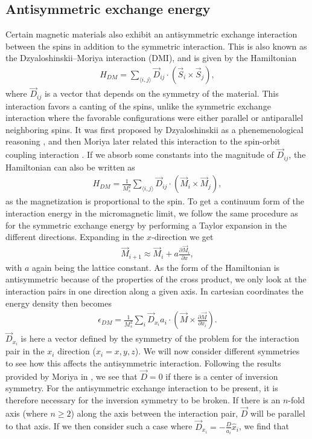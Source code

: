 \documentclass[12pt, a4paper]{article}		%
\numberwithin{equation}{section}
\begin{document}
\subsection{Antisymmetric exchange energy}
Certain magnetic materials also exhibit an antisymmetric exchange interaction between the spins in addition to the symmetric interaction. This is also known as the Dzyaloshinskii--Moriya interaction (DMI), and is given by the Hamiltonian
\begin{align}
\label{eq:DMI_Hamiltonian_S}
H_{DM} = \sum_{\langle i,j \rangle} \vec{D}_{ij} \cdot (\vec{S}_i\times\vec{S}_j),
\end{align}
where $\vec{D}_{ij}$ is a vector that depends on the symmetry of the material. This interaction favors a canting of the spins, unlike the symmetric exchange interaction where the favorable configurations were either parallel or antiparallel neighboring spins. It was first proposed by Dzyaloshinskii as a phenemenological reasoning \cite{Dzyaloshinskii1958}, and then Moriya later related this interaction to the spin-orbit coupling interaction \cite{Moriya1960}. If we absorb some constants into the magnitude of $\vec{D}_{ij}$, the Hamiltonian can also be written as
\begin{align}
\label{eq:DMI_Hamiltonian_M}
H_{DM} = \frac{1}{M_s^2}\sum_{\langle i,j \rangle} \vec{D}_{ij} \cdot (\vec{M}_i\times\vec{M}_j),
\end{align}
as the magnetization is proportional to the spin. To get a continuum form of the interaction energy in the micromagnetic limit, we follow the same procedure as for the symmetric exchange energy by performing a Taylor expansion in the different directions. Expanding in the $x$-direction we get
\begin{align}
\vec{M}_{i+1} \approx \vec{M}_i + a\frac{\partial \vec{M}_i}{\partial x},
\end{align}
with $a$ again being the lattice constant. As the form of the Hamiltonian is antisymmetric because of the properties of the cross product, we only look at the interaction pairs in one direction along a given axis. In cartesian coordinates the energy density then becomes
\begin{align}
\epsilon_{DM} = \frac{1}{M_s^2}\sum_i\vec{D}_{x_i}a_i\cdot(\vec{M}\times\frac{\partial \vec{M}}{\partial x_i}).
\end{align}
$\vec{D}_{x_i}$ is here a vector defined by the symmetry of the problem for the interaction pair in the $x_i$ direction ($x_i = x, y, z$). We will now consider different symmetries to see how this affects the antisymmetric interaction. Following the results provided by Moriya in \cite{Moriya1960}, we see that $\vec{D} = 0$ if there is a center of inversion symmetry. For the antisymmetric exchange interaction to be present, it is therefore necessary for the inversion symmetry to be broken. If there is an $n$-fold axis (where $n\geq2$) along the axis between the interaction pair, $\vec{D}$ will be parallel to that axis. If we then consider such a case where $\vec{D}_{x_i} = -\frac{D}{a_i} \hat{x}_i$, we find that
\end{document}
